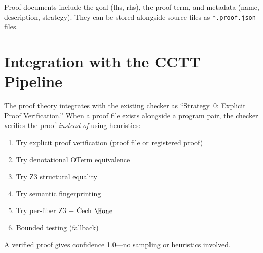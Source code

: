 Proof documents include the goal (lhs, rhs), the proof term, and
metadata (name, description, strategy).  They can be stored alongside
source files as \texttt{*.proof.json} files.

\section{Integration with the CCTT Pipeline}

The proof theory integrates with the existing checker as
``Strategy~0: Explicit Proof Verification.''  When a proof file
exists alongside a program pair, the checker verifies the proof
\emph{instead of} using heuristics:

\begin{enumerate}
\item Try explicit proof verification (proof file or registered proof)
\item Try denotational OTerm equivalence
\item Try Z3 structural equality
\item Try semantic fingerprinting
\item Try per-fiber Z3 + \v{C}ech $\Hone$
\item Bounded testing (fallback)
\end{enumerate}

A verified proof gives confidence 1.0---no sampling or heuristics
involved.

